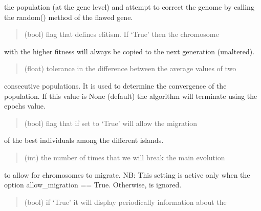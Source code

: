 \documentclass[letterpaper,10pt,english]{sphinxmanual}
\begin{document}
\begin{fulllineitems}
\begin{fulllineitems}
\sphinxAtStartPar
the population (at the gene level) and attempt to correct the genome by calling
the random() method of the flawed gene.
\begin{quote}\begin{description}
\sphinxAtStartPar
{} \textendash{} (bool) flag that defines elitism. If ‘True’ then the chromosome

\end{description}\end{quote}

\sphinxAtStartPar
with the higher fitness will always be copied to the next generation (unaltered).
\begin{quote}\begin{description}
\sphinxAtStartPar
{} \textendash{} (float) tolerance in the difference between the average values of two

\end{description}\end{quote}

\sphinxAtStartPar
consecutive populations. It is used to determine the convergence of the population.
If this value is None (default) the algorithm will terminate using the epochs value.
\begin{quote}\begin{description}
\sphinxAtStartPar
{} \textendash{} (bool) flag that if set to ‘True’ will allow the migration

\end{description}\end{quote}

\sphinxAtStartPar
of the best individuals among the different islands.
\begin{quote}\begin{description}
\sphinxAtStartPar
{} \textendash{} (int) the number of times that we will break the main evolution

\end{description}\end{quote}

\sphinxAtStartPar
to allow for chromosomes to migrate. NB: This setting is active only when the option
allow\_migration == True. Otherwise, is ignored.
\begin{quote}\begin{description}
\sphinxAtStartPar
{} \textendash{} (bool) if ‘True’ it will display periodically information about the


\end{description}
\end{quote}
\end{fulllineitems}
\end{fulllineitems}
\end{document}
